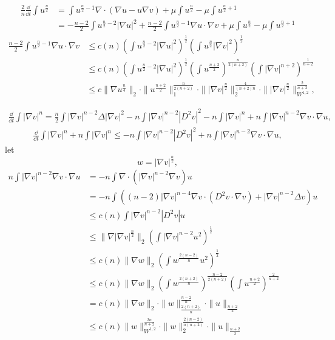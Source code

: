 \begin{align*}
	\frac2n\frac{\dd}{\dd t}\int u^{\frac n2} 
	&= \int u^{\frac n2-1}\nabla\cdot(\nabla u - u\nabla v) + \mu\int u^{\frac n2} - \mu\int u^{\frac n2+1}\\
	&= -\frac{n-2}{2}\int u^{\frac n2-2}|\nabla u|^2 
		+ \frac{n-2}{2}\int u^{\frac n2-1}\nabla u\cdot\nabla v + \mu\int u^{\frac n2} - \mu\int u^{\frac n2+1}
\end{align*}
\begin{align*}
	\frac{n-2}{2}\int u^{\frac n2-1}\nabla u\cdot\nabla v
	&\leq c(n) \left(\int u^{\frac n2-2}|\nabla u|^2\right)^{\frac12}
		\left(\int u^{\frac n2}|\nabla v|^2\right)^{\frac12}\\
	&\leq c(n) \left(\int u^{\frac n2-2}|\nabla u|^2\right)^{\frac12}
		\left(\int u^{\frac{n+2}{2}}\right)^{\frac{n}{2(n+2)}}
		\left(\int |\nabla v|^{n+2}\right)^{\frac1{n+2}}\\
	&\leq c\|\nabla u^{\frac n4}\|_2
		\cdot \|u^{\frac{n+2}{2}}\|_1^{\frac{n}{2(n+2)}}
		\cdot \||\nabla v|^{\frac n2}\|_2^{\frac{4}{(n+2)n}}
		\cdot \||\nabla v|^{\frac n2}\|_{W^{1,2}}^{\frac{2}{n+2}},
\end{align*}

\begin{align*}
	\frac{\dd}{\dd t}\int |\nabla v|^n 
	= \frac{n}{2} \int |\nabla v|^{n-2}\Delta |\nabla v|^2 - n\int |\nabla v|^{n-2}|D^2v|^2
		- n\int |\nabla v|^n 
		+ n\int |\nabla v|^{n-2}\nabla v\cdot\nabla u,
\end{align*}
\begin{align*}
	\frac{\dd}{\dd t}\int |\nabla v|^n 
		+ n\int |\nabla v|^n
	\leq - n\int |\nabla v|^{n-2}|D^2v|^2
		+ n\int |\nabla v|^{n-2}\nabla v\cdot\nabla u,
\end{align*}
let 
\[
	w=|\nabla v|^{\frac n2},
\]
\begin{align*}
	n\int |\nabla v|^{n-2}\nabla v\cdot\nabla u
	&= -n\int \nabla\cdot(|\nabla v|^{n-2}\nabla v)u \\
	&= -n\int((n-2)|\nabla v|^{n-4}\nabla v \cdot (D^2v\cdot\nabla v) + |\nabla v|^{n-2}\Delta v) u\\
	&\leq c(n)\int |\nabla v|^{n-2}|D^2v|u\\
	&\leq \|\nabla|\nabla v|^{\frac{n}{2}}\|_2\left(\int |\nabla v|^{n-2}u^2\right)^{\frac12}\\
	&\leq c(n)\|\nabla w\|_2\left(\int w^{\frac{2(n-2)}{n}}u^2\right)^{\frac12}\\
	&\leq c(n)\|\nabla w\|_2 \left(\int w^{\frac{2(n+2)}{n}}\right)^{\frac{n-2}{2(n+2)}}
		\left(\int u^{\frac{n+2}{2}}\right)^{\frac{2}{n+2}}\\
	&= c(n)\|\nabla w\|_2 
		\cdot \|w\|_{\frac{2(n+2)}{n}}^{\frac{n-2}{n}}
		\cdot \|u\|_{\frac{n+2}{2}}\\
	&\leq c(n)\|w\|_{W^{1,2}}^{\frac{2n}{n+2}}
		\cdot \|w\|_2^{\frac{2(n-2)}{n(n+2)}}
		\cdot \|u\|_{\frac{n+2}{2}}
\end{align*}
